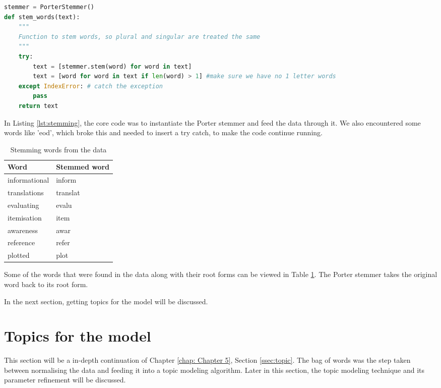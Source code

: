 \begin{lstlisting}[language=Python, label={lst:stemming}, caption=Stemming the corpus]
stemmer = PorterStemmer()
def stem_words(text):
    """
    Function to stem words, so plural and singular are treated the same
    """
    try:
        text = [stemmer.stem(word) for word in text]
        text = [word for word in text if len(word) > 1] #make sure we have no 1 letter words
    except IndexError: # catch the exception
        pass
    return text

\end{lstlisting}

In Listing \ref{lst:stemming}, the core code was to instantiate the Porter stemmer and feed the data through it. We also encountered some words like ’eod’, which  broke this and needed to insert a try catch, to make the code continue running.

\begin{table}[htbp]
\centering
\begin{tabular}{|l|l|}
\hline
\textbf{Word} & \textbf{Stemmed word} \\ \hline
informational & inform \\ \hline
translations & translat \\ \hline
evaluating & evalu \\ \hline
itemisation & item \\ \hline
awareness & awar \\ \hline
reference & refer \\ \hline
plotted & plot \\ \hline
\end{tabular}
\caption{Stemming words from the data}
\label{tab:stemming}
\end{table}


Some of the words that were found in the data along with their root forms can be viewed in Table \ref{tab:stemming}. The Porter stemmer takes the original word back to its root form.

In the next section, getting topics for the model will be discussed.

\section{Topics for the model}

This section will be a in-depth continuation of Chapter \ref{chap: Chapter 5}, Section \ref{ssec:topic}. The bag of words was the step taken between normalising the data and feeding it into a topic modeling algorithm. Later in this section, the topic modeling technique and its parameter refinement will be discussed.

